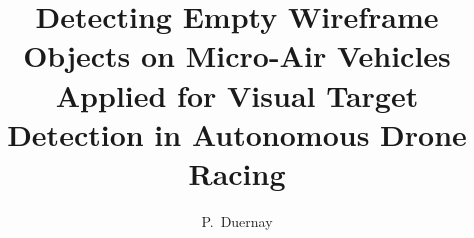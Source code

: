 \documentclass{tudelft-report}
\begin{document}
\frontmatter

\title[]{Detecting Empty Wireframe Objects on Micro-Air Vehicles \\ { \small Applied for Visual Target Detection in Autonomous Drone Racing}}
\author{P.\ Duernay}





\tableofcontents

\mainmatter









%
%
\appendix




\end{document}
